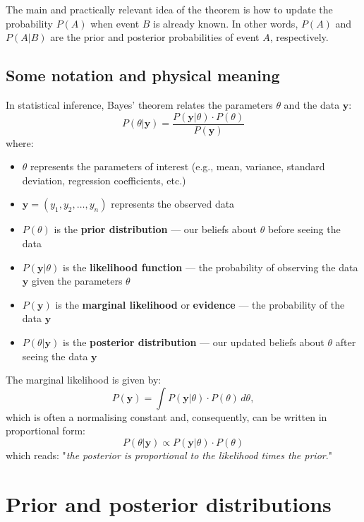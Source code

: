 The main and practically relevant idea of the theorem is how to update the probability $P(A)$ when event $B$ is already known. In other words, $P(A)$ and $P(A|B)$ are the prior and posterior probabilities of event $A$, respectively.

\subsection{Some notation and physical meaning}
In statistical inference, Bayes' theorem relates the parameters $\theta$ and the data $\mathbf{y}$:
\begin{equation}\label{eq:bayes_inference}
\boxed{P(\theta|\mathbf{y}) = \frac{P(\mathbf{y}|\theta) \cdot P(\theta)}{P(\mathbf{y})}}
\end{equation}
where:
\begin{itemize}
\item $\theta$ represents the parameters of interest (e.g., mean, variance, standard deviation, regression coefficients, etc.)
\item $\mathbf{y} = (y_1, y_2, \dots, y_n)$ represents the observed data
\item $P(\theta)$ is the \textbf{prior distribution} — our beliefs about $\theta$ before seeing the data
\item $P(\mathbf{y}|\theta)$ is the \textbf{likelihood function} — the probability of observing the data $\mathbf{y}$ given the parameters $\theta$
\item $P(\mathbf{y})$ is the \textbf{marginal likelihood} or \textbf{evidence} — the probability of the data $\mathbf{y}$
\item $P(\theta|\mathbf{y})$ is the \textbf{posterior distribution} — our updated beliefs about $\theta$ after seeing the data $\mathbf{y}$
\end{itemize}
The marginal likelihood is given by:
\begin{equation}\label{eq:marginal_likelihood}
P(\mathbf{y}) = \int P(\mathbf{y}|\theta) \cdot P(\theta) \, d\theta,
\end{equation}
which is often a normalising constant and, consequently, can be written in proportional form:
\begin{equation}\label{eq:bayes_proportional}
\boxed{P(\theta|\mathbf{y}) \propto P(\mathbf{y}|\theta) \cdot P(\theta)}
\end{equation}
which reads: "\textit{the posterior is proportional to the likelihood times the prior}."

\section{Prior and posterior distributions}

